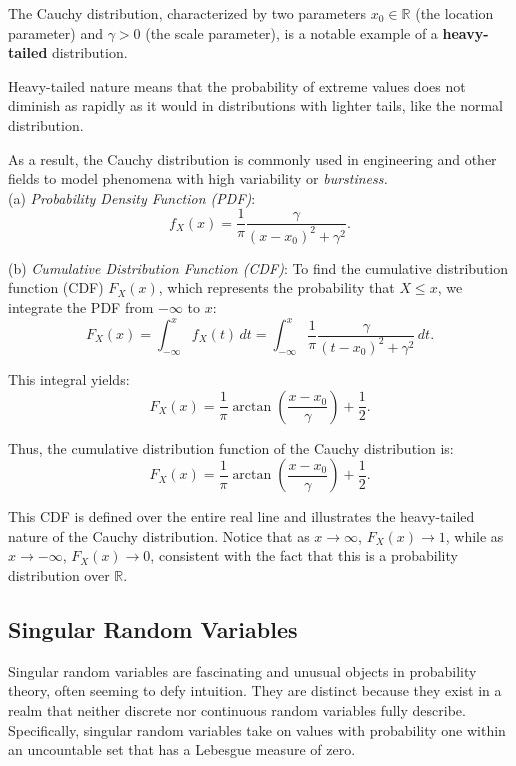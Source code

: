 The Cauchy distribution, characterized by two parameters \( x_0 \in \mathbb{R} \) (the location parameter) and \( \gamma > 0 \) (the scale parameter), is a notable example of a \textbf{heavy-tailed} distribution. 

\begin{definition}
    Heavy-tailed nature means that the probability of extreme values does not diminish as rapidly as it would in distributions with lighter tails, like the normal distribution.
\end{definition}

As a result, the Cauchy distribution is commonly used in engineering and other fields to model phenomena with high variability or \textit{burstiness.}\\

(a) \textit{Probability Density Function (PDF)}: 
\[
f_X(x) = \frac{1}{\pi} \frac{\gamma}{(x - x_0)^2 + \gamma^2}.
\]

(b) \textit{Cumulative Distribution Function (CDF)}: To find the cumulative distribution function (CDF) \( F_X(x) \), which represents the probability that \( X \leq x \), we integrate the PDF from \( -\infty \) to \( x \):
\[
F_X(x) = \int_{-\infty}^{x} f_X(t) \, dt = \int_{-\infty}^{x} \frac{1}{\pi} \frac{\gamma}{(t - x_0)^2 + \gamma^2} \, dt.
\]

This integral yields:
\[
F_X(x) = \frac{1}{\pi} \arctan\left( \frac{x - x_0}{\gamma} \right) + \frac{1}{2}.
\]

Thus, the cumulative distribution function of the Cauchy distribution is:
\[
F_X(x) = \frac{1}{\pi} \arctan\left( \frac{x - x_0}{\gamma} \right) + \frac{1}{2}.
\]

This CDF is defined over the entire real line and illustrates the heavy-tailed nature of the Cauchy distribution. Notice that as \( x \to \infty \), \( F_X(x) \to 1 \), while as \( x \to -\infty \), \( F_X(x) \to 0 \), consistent with the fact that this is a probability distribution over \( \mathbb{R} \).

\subsection{Singular Random Variables}

Singular random variables are fascinating and unusual objects in probability theory, often seeming to defy intuition. They are distinct because they exist in a realm that neither discrete nor continuous random variables fully describe. Specifically, singular random variables take on values with probability one within an uncountable set that has a Lebesgue measure of zero. 


